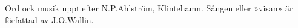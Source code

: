 Ord ock musik uppt.\@ efter N.\@ P.\@ Ahlström, Klintehamn.
Sången eller »visan» är författad av J.\@ O.\@ Wallin.